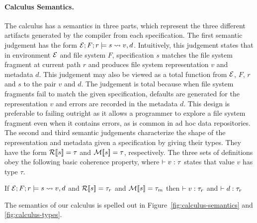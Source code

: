\documentclass[nocopyrightspace,natbib]{sigplanconf}
\begin{document}
\paragraph*{Calculus Semantics.}
The calculus has a semantics in three parts, which represent the three different
artifacts generated by the \forest{} compiler from each specification.  The
first semantic judgement has the form $\mathcal{E};F;r \models s \rightsquigarrow v,d$.
Intuitively, this judgement states that in environment $\mathcal{E}$ and file system
$F$, specification $s$ matches the file system fragment at current path $r$
and produces file system representation $v$ and metadata $d$.  This judgement
may also be viewed as a total function from $\mathcal{E}$, $F$, $r$ and $s$ to the
pair $v$ and $d$.  The judgement is total because when file system fragments
fail to match the given specification, defaults are generated for the representation
$v$ and errors are recorded in the metadata $d$.  This design is preferable to
failing outright as it allows a programmer
to explore a file system fragment even when it contains errors, as is common
in ad hoc data repositories.  The second and third
semantic judgements characterize the shape of the representation and metadata
given a specification by giving their types.  They have the form ${\cal R}[\![ s ]\!] = \tau$ and
${\cal M}[\![ s ]\!] = \tau$, respectively.  The three sets of definitions obey the following
basic coherence property, where $\mathrel{\vdash} v : \tau$ states that value $v$ has type $\tau$.

\begin{proposition}
If $\mathcal{E};F;r \models s \rightsquigarrow v,d$ and
${\cal R}[\![ s ]\!] = \tau_r$ and ${\cal M}[\![ s ]\!] = \tau_m$
then $\mathrel{\vdash} v : \tau_r$ and $\mathrel{\vdash} d : \tau_r$ 
\end{proposition}


The semantics of our calculus is spelled out in Figure~\ref{fig:calculus-semantics} 
and \ref{fig:calculus-types}.
\end{document}
